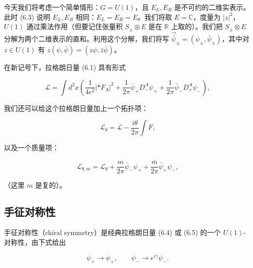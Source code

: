 
今天我们将考虑一个简单情形：$G=U(1)$，且 $E_L,E_R$ 是不可约的二维实表示。此时 (6.3) 说明 $E_L,E_R$ 相同：$E_L=E_R=E$。我们将取 $E=\mathbb{C}$，度量为 $|z|^2$，$U(1)$ 通过乘法作用（但要记住张量积 $S_\pm\otimes E$ 是在 $\mathbb{R}$ 上取的）。我们把 $S_\pm\otimes E$ 分解为两个二维表示的直和。利用这个分解，我们将写 $\overrightarrow{\bar\psi}_\pm=(\psi_\pm,\bar\psi_\pm)$，其中对 $z\in U(1)$ 有 $z(\psi,\bar\psi)=(z\psi,\bar z\bar\psi)$。

在新记号下，拉格朗日量 (6.1) 具有形式

\begin{equation}
  \tag{6.4}
  \label{eq:6-4}
  \mathcal{L}=\int d^2x\left(\frac{1}{4e^2}|\ast F_A|^2+\frac{1}{2\pi}\bar\psi_+D^A_-\psi_++\frac{1}{2\pi}\bar\psi_-D^A_+\psi_-\right),
\end{equation}

我们还可以给这个拉格朗日量加上一个拓扑项：

\begin{equation}
  \tag{6.5}
  \label{eq:6-5}
  \mathcal{L}_\theta=\mathcal{L}-\frac{i\theta}{2\pi}\int F,
\end{equation}

以及一个质量项：

\begin{equation}
  \tag{6.6}
  \label{eq:6-6}
  \mathcal{L}_{\theta,m}=\mathcal{L}_\theta+\frac{m}{2\pi}\bar\psi_-\psi_++\frac{\bar m}{2\pi}\bar\psi_+\psi_-,
\end{equation}

（这里 $m$ 是复的）。

\subsection{手征对称性}

手征对称性（chiral symmetry）是经典拉格朗日量 (6.4) 或 (6.5) 的一个 $U(1)$-对称性，由下式给出

\begin{equation}
  \tag{6.7}
  \label{eq:6-7}
  \psi_+\to\psi_+,\qquad \psi_-\to e^{i\gamma}\psi_-.
\end{equation}

